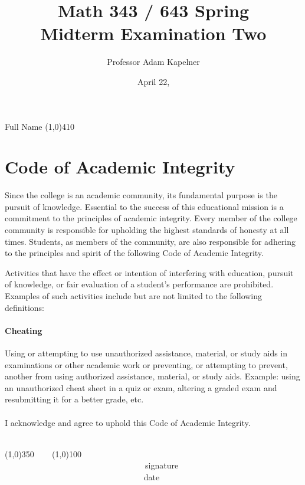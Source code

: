 \documentclass[12pt]{article}
\title{Math 343 / 643 Spring \the\year{} \\ Midterm Examination Two}
\author{Professor Adam Kapelner}
\date{April 22, \the\year{}}
\begin{document}
\maketitle

\noindent Full Name \line(1,0){410}

\thispagestyle{empty}

\section*{Code of Academic Integrity}

\footnotesize
Since the college is an academic community, its fundamental purpose is the pursuit of knowledge. Essential to the success of this educational mission is a commitment to the principles of academic integrity. Every member of the college community is responsible for upholding the highest standards of honesty at all times. Students, as members of the community, are also responsible for adhering to the principles and spirit of the following Code of Academic Integrity.

Activities that have the effect or intention of interfering with education, pursuit of knowledge, or fair evaluation of a student's performance are prohibited. Examples of such activities include but are not limited to the following definitions:

\paragraph{Cheating} Using or attempting to use unauthorized assistance, material, or study aids in examinations or other academic work or preventing, or attempting to prevent, another from using authorized assistance, material, or study aids. Example: using an unauthorized cheat sheet in a quiz or exam, altering a graded exam and resubmitting it for a better grade, etc.\\
\\
\noindent I acknowledge and agree to uphold this Code of Academic Integrity. \\~\\

\begin{center}
\line(1,0){350} ~~~ \line(1,0){100}\\
~~~~~~~~~~~~~~~~~~~~~~~~~~~~~~~~~~signature~~~~~~~~~~~~~~~~~~~~~~~~~~~~~~~~~~~~~~~~~~~~~~~~~~~~~~~~~~~~~~ date
\end{center}

\normalsize
\end{document}
